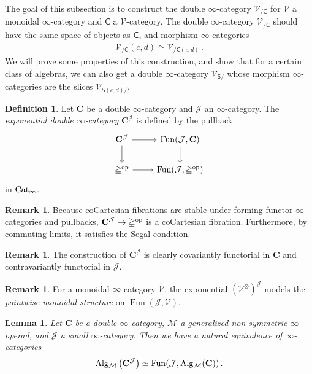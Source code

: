 \documentclass[10pt]{amsart}
\numberwithin{equation}{section}
\newtheorem{lem}[prop]{Lemma}
\theoremstyle{definition}
\newtheorem{definition}[prop]{Definition}
\newtheorem{rem}[prop]{Remark}
\DeclareMathOperator{\Fun}{Fun}
\DeclareMathOperator{\op}{op}
\newcommand{\Cat}{\mathrm{Cat}\vphantom{t}}
\newcommand{\Alg}{\mathrm{Alg}\vphantom{z}}
\newcommand{\Simp}{\mathbb{\Delta}}
\newcommand{\cJ}{\mathcal{J}}
\newcommand{\cM}{\mathcal{M}}
\newcommand{\cV}{\mathcal{V}}
\newcommand{\bfC}{\mathbf{C}}
\newcommand{\sfC}{\mathsf{C}}
\newcommand{\sfS}{\mathsf{S}}
\renewcommand{\to}{\mathchoice{\longrightarrow}{\rightarrow}{}{}}
\begin{document}
	The goal of this subsection is to construct the double $\infty$-category $\cV_{/\sfC}$ for $\cV$ a monoidal $\infty$-category and $\sfC$ a $\cV$-category. The double $\infty$-category $\cV_{/\sfC}$ should have the same space of objects as $\sfC$, and morphism $\infty$-categories
	\begin{align*}
		\cV_{/\sfC}(c,d) \simeq \cV_{/\sfC(c,d)} \,.
	\end{align*}
	We will prove some properties of this construction, and show that for a certain class of algebras, we can also get a double $\infty$-category $\cV_{\sfS/}$ whose morphism $\infty$-categories are the slices $\cV_{\sfS(c,d)/}$.
	\begin{definition}\label{def:exponential_double_cat}
		Let $\bfC$ be a double $\infty$-category and $\cJ$ an $\infty$-category.
		The \emph{exponential double $\infty$-category} $\bfC^{\cJ}$ is defined by the pullback
		\begin{equation*}
			\begin{tikzcd}
				\bfC^{\cJ} \arrow[r] \arrow[d] & \Fun(\cJ, \bfC)\arrow[d] \\
				\Simp^{\op} \arrow[r] & \Fun(\cJ, \Simp^{\op})
			\end{tikzcd}
		\end{equation*}
		in  $\Cat_{\infty}$.
	\end{definition}

	\begin{rem}\label{rem:C^J_is_double_cat}
		Because coCartesian fibrations are stable under forming functor $\infty$-categories and pullbacks, $\bfC^{\cJ}\to \Simp^{\op}$ is a coCartesian fibration.
		Furthermore, by commuting limits, it satisfies the Segal condition.
	\end{rem}

	\begin{rem}\label{rem:C*J_is_functorial}
		The construction of $\bfC^{\cJ}$ is clearly covariantly functorial in $\bfC$ and contravariantly functorial in $\cJ$.
	\end{rem}

	\begin{rem}\label{V^J_is_pointwise_monoidal}
		For a monoidal $\infty$-category $\cV$, the exponential $(\cV^{\otimes})^{\cJ}$ models the \emph{pointwise monoidal structure} on $\Fun(\cJ,\cV)$.
	\end{rem}

	\begin{lem}\label{lem:alg_in_exponential}
		Let $\bfC$ be a double $\infty$-category, $\cM$ a generalized non-symmetric $\infty$-operad, and $\cJ$ a small $\infty$-category.
    Then we have a natural equivalence of $\infty$-categories
		\begin{align*}
			\Alg_{\cM}\left(\bfC^{\cJ} \right) \simeq   \Fun(\cJ, \Alg_{\cM}(\bfC)) \,.
		\end{align*}
	\end{lem}
\end{document}
